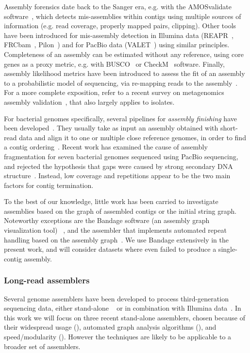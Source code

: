 \documentclass[./main.tex]{subfiles}
\newcommand{\modafterreview}[1]{#1}
\begin{document}
Assembly forensics date back to the Sanger era, e.g. with the AMOSvalidate software~\citep{amosvalidate}, which detects mis-assemblies within contigs using multiple sources of information (e.g. read coverage, properly mapped pairs, clipping). Other tools have been introduced for mis-assembly detection in Illumina data (REAPR~\citep{REAPR}, FRCbam~\citep{FRCbam}, Pilon~\citep{Pilon}) and for PacBio data (VALET~\citep{VALET}) using similar principles. Completeness of an assembly can be estimated without any reference, using core genes as a proxy metric, e.g. with BUSCO~\citep{busco} or CheckM~\citep{parks2015checkm} software. Finally, assembly likelihood metrics have been introduced to assess the fit of an assembly to a probabilistic model of sequencing, via re-mapping reads to the assembly~\citep{clark2013ale,rahman2013cgal,ghodsi2013novo}.
For a more complete exposition, refer to a recent survey on metagenomics assembly validation~\citep{olson2017metagenomic}, that also largely applies to isolates.

For bacterial genomes specifically, several pipelines for \emph{assembly finishing} have been developed~\citep{bosi2015medusa}. They usually take as input an assembly obtained with short-read data and align it to one or multiple close reference genomes, in order to find a contig ordering~\citep{kremer2017approaches}.
Recent work has examined the cause of assembly fragmentation for seven bacterial genomes sequenced using PacBio sequencing, and rejected the hypothesis that gaps were caused by strong secondary DNA structure~\citep{utturkar2017case}. Instead, low coverage and repetitions appear to be the two main factors for contig termination.


To the best of our knowledge, little work has been carried to investigate assemblies based on the graph of assembled contigs or the initial string graph. Noteworthy exceptions are the Bandage software (an assembly graph visualization tool) ~\citep{bandage}, and the \hinge assembler that implements automated \modafterreview
{repeat handling based on the assembly graph}~\citep{hinge}. We use Bandage extensively in the present work, and \modafterreview{will consider datasets where even \hinge failed to produce a single-contig assembly}.

\subsubsection{Long-read assemblers}

Several genome assemblers have been developed to process third-generation sequencing data, either stand-alone ~\citep{canu,miniasm,hinge, abruijn} or in combination with Illumina data~\citep{dbg2olc,hybridspades,unicycler, zimin2013masurca}. 
In this work we will focus on three recent stand-alone assemblers, chosen because of their widespread usage (\canu), automated graph analysis algorithms (\hinge), and speed/modularity (\miniasm). However the  techniques are likely to be applicable to a broader set of assemblers.
\end{document}
